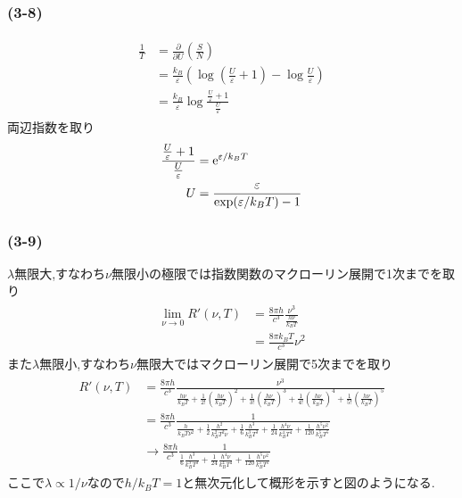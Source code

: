 \subsubsection*{(3-8)}
\begin{align}
  \begin{split}
    \frac{1}{T}&=\frac{\partial}{\partial U}\left(\frac{S}{N}\right)\\
    &=\frac{k_B}{\varepsilon}\left(\log\left(\frac{U}{\varepsilon}+1\right)-\log\frac{U}{\varepsilon}\right)\\
    &=\frac{k_B}{\varepsilon}\log\frac{\frac{U}{\varepsilon}+1}{\frac{U}{\varepsilon}}
  \end{split}
\end{align}
両辺指数を取り
\begin{align}
  \begin{split}
    \frac{\frac{U}{\varepsilon}+1}{\frac{U}{\varepsilon}}&={\rm e}^{\varepsilon/k_BT}\\
    U&=\frac{\varepsilon}{\exp(\varepsilon/k_BT)-1}
  \end{split}
\end{align}
\subsubsection*{(3-9)}
$\lambda$無限大,すなわち$\nu$無限小の極限では指数関数のマクローリン展開で1次までを取り
\begin{align}
  \begin{split}
    \lim_{\nu\rightarrow 0} R'(\nu,T)&=\frac{8\pi h}{c^3}\frac{\nu^3}{\frac{h\nu}{k_BT}}\\
    &=\frac{8\pi k_BT}{c^3}\nu^2
  \end{split}
\end{align}
また$\lambda$無限小,すなわち$\nu$無限大ではマクローリン展開で5次までを取り
\begin{align}
  \begin{split}
    R'(\nu,T)&=\frac{8\pi h}{c^3}\frac{\nu^3}{\frac{h\nu}{k_BT}+\frac{1}{2!}\left(\frac{h\nu}{k_BT}\right)^2+\frac{1}{3!}\left(\frac{h\nu}{k_BT}\right)^3+\frac{1}{4!}\left(\frac{h\nu}{k_BT}\right)^4+\frac{1}{5!}\left(\frac{h\nu}{k_BT}\right)^5}\\
    &=\frac{8\pi h}{c^3}\frac{1}{\frac{h}{k_BT\nu^2}+\frac{1}{2}\frac{h^2}{k_B^2T^2\nu}+\frac{1}{6}\frac{h^3}{k_B^3T^3}+\frac{1}{24}\frac{h^4\nu}{k_B^4T^4}+\frac{1}{120}\frac{h^5\nu^2}{k_B^5T^5}}\\
    &\rightarrow\frac{8\pi h}{c^3}\frac{1}{\frac{1}{6}\frac{h^3}{k_B^3T^3}+\frac{1}{24}\frac{h^4\nu}{k_B^4T^4}+\frac{1}{120}\frac{h^5\nu^2}{k_B^5T^5}}
  \end{split}
\end{align}
ここで$\lambda\propto1/\nu$なので$h/k_BT=1$と無次元化して概形を示すと図のようになる.

